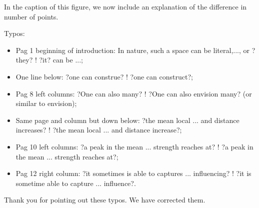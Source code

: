 \documentclass[12pt]{article}
\begin{document}
{\color{res} In the caption of this figure, we now include an explanation of the difference in number of points.}

\pagebreak

Typos:
\begin{itemize}
\item Pag 1 beginning of introduction: In nature, such a space can be literal,..., or ?they? !
?it? can be ...;
\item One line below: ?one can construe? ! ?one can construct?;
\item Pag 8 left columns: ?One can also many? ! ?One can also envision many? (or similar
to envision);
\item Same page and column but down below: ?the mean local ... and distance increases?
! ?the mean local ... and distance increase?;
\item Pag 10 left columns: ?a peak in the mean ... strength reaches at? ! ?a peak in the
mean ... strength reaches at?;
\item Pag 12 right column: ?it sometimes is able to captures ... influencing? ! ?it is sometime
able to capture ... influence?.
\end{itemize}

{\color{res} Thank you for pointing out these typos. We have corrected them.}
\end{document}

